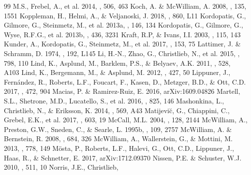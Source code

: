 \documentclass[preprint]{aastex61}
\begin{document}
{\begin{thebibliography}{99}
  M.S., Frebel, A., et al. 2014, \nat, 506, 463
 Koch, A. \&
  McWilliam, A. 2008, \aj, 135, 1551
 Koppleman, H., Helmi,
  A., \& Veljanoski, J. 2018, \apjl, 860, L11 
 Kordopatis, G., Gilmore,
  G., Steinmetz, M., et al. 2013a, \aj, 146, 134
 Kordopatis, G.,
  Gilmore, G., Wyse, R.F.G., et al. 2013b, \mnras, 436, 3231
 Kraft, R.P, \& Ivans,
  I.I. 2003, \pasp, 115, 143
 Kunder, A., Kordopatis, G.,
  Steinmetz, M., et al. 2017, \aj, 153, 75
 Lattimer,
  J. \& Schramm, D. 1974, \apjl, 192, L145
 Li, H.-N., Zhao, G., Christlieb,
  N., et al. 2015, \apj, 798, 110
 Lind, K., Asplund, M., Barklem,
  P.S., \& Belyaev, A.K. 2011, \aap, 528, A103
 Lind, K., Bergemann, M., \&
  Asplund, M. 2012, \mnras, 427, 50
 Lippuner, J.,
  Fern\'{a}ndez, R., Roberts, L.F., Foucart, F., Kasen, D., Metzger,
  B.D., \& Ott, C.D. 2017, \mnras, 472, 904
 Macias,
  P. \& Ramirez-Ruiz, E. 2016, arXiv:1609.04826
 Martell, S.L., Shetrone,
  M.D., Lucatello, S., et al. 2016, \apj, 825, 146
 Mashonkina, L.,
  Christlieb, N., \& Eriksson, K. 2014, \aap, 569, A43
 Matijevi\u{c},
  G., Chiappini, C., Grebel, E.K., et al. 2017, \aap, 603, 19
 McCall, M.L. 2004, \aj, 128, 2144
 McWilliam, A.,
Preston, G.W., Sneden, C., \& Searle, L. 1995b, \aj, 109, 2757
 McWilliam, A. \&
Bernstein, R. 2008, \apj, 684, 326
 McWilliam, A.,
  Wallerstein, G., \& Mottini, M. 2013, \apj, 778, 149
 M{\"o}sta, P., Roberts,
  L.F., Halevi, G., Ott, C.D., Lippuner, J., Haas, R., \& Schnetter,
  E. 2017, arXiv:1712.09370
 Nissen,
  P.E. \& Schuster, W.J. 2010, \aap, 511, 10
 Norris, J.E., Christlieb,

\end{thebibliography}}
\end{document}
